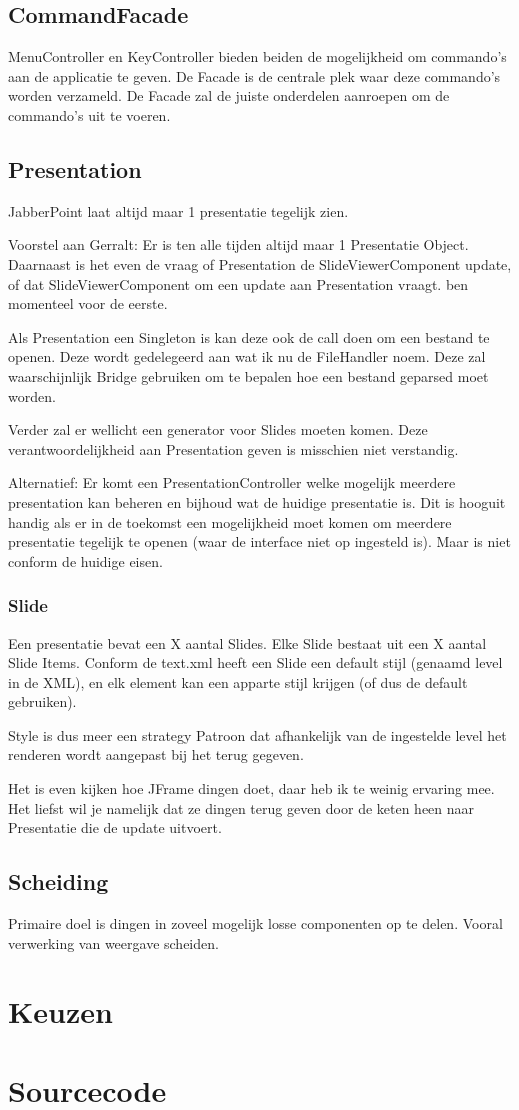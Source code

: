\documentclass[a4paper]{article}
\begin{document}
\subsection{CommandFacade}
MenuController en KeyController bieden beiden de mogelijkheid om commando's aan
de applicatie te geven. De Facade is de centrale plek waar deze commando's
worden verzameld. De Facade zal de juiste onderdelen aanroepen om de commando's
uit te voeren.

\subsection{Presentation}
JabberPoint laat altijd maar 1 presentatie tegelijk zien.

Voorstel aan Gerralt: Er is ten alle tijden altijd maar 1 Presentatie Object.
Daarnaast is het even de vraag of Presentation de SlideViewerComponent update,
of dat SlideViewerComponent om een update aan Presentation vraagt. ben momenteel
voor de eerste.

Als Presentation een Singleton is kan deze ook de call doen om een bestand te
openen. Deze wordt gedelegeerd aan wat ik nu de FileHandler noem. Deze zal
waarschijnlijk Bridge gebruiken om te bepalen hoe een bestand geparsed moet
worden.

Verder zal er wellicht een generator voor Slides moeten komen. Deze
verantwoordelijkheid aan Presentation geven is misschien niet verstandig.

Alternatief: Er komt een PresentationController welke mogelijk meerdere
presentation kan beheren en bijhoud wat de huidige presentatie is. Dit is
hooguit handig als er in de toekomst een mogelijkheid moet komen om meerdere
presentatie tegelijk te openen (waar de interface niet op ingesteld is). Maar is
niet conform de huidige eisen.

\subsubsection{Slide}
Een presentatie bevat een X aantal Slides. Elke Slide bestaat uit een X aantal
Slide Items. Conform de text.xml heeft een Slide een default stijl (genaamd
level in de XML), en elk element kan een apparte stijl krijgen (of dus de
default gebruiken).

Style is dus meer een strategy Patroon dat afhankelijk van de ingestelde level
het renderen wordt aangepast bij het terug gegeven.

Het is even kijken hoe JFrame dingen doet, daar heb ik te weinig ervaring mee.
Het liefst wil je namelijk dat ze dingen terug geven door de keten heen naar
Presentatie die de update uitvoert.

\subsection{Scheiding}
Primaire doel is dingen in zoveel mogelijk losse componenten op te delen.
Vooral verwerking van weergave scheiden.

\section{Keuzen}



\section{Sourcecode}
\end{document}
